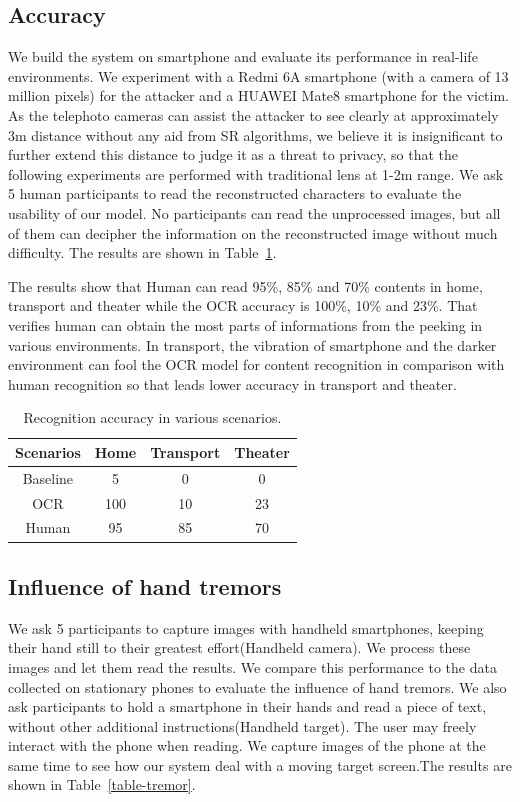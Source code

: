 \subsection{Accuracy}
We build the system on smartphone and evaluate its performance in real-life environments. We experiment with a Redmi 6A smartphone (with a camera of 13 million pixels) for the attacker and a HUAWEI Mate8 smartphone for the victim. As the telephoto cameras can assist the attacker to see clearly at approximately 3m distance without any aid from SR algorithms, we believe it is insignificant to further extend this distance to judge it as a threat to privacy, so that the following experiments are performed with traditional lens at 1-2m range. We ask 5 human participants to read the reconstructed characters to evaluate the usability of our model. No participants can read the unprocessed images, but all of them can decipher the information on the reconstructed image without much difficulty. The results are shown in Table~\ref{table-scenarios}.

The results show that Human can read 95\%, 85\% and 70\% contents in home, transport and theater while the OCR accuracy is 100\%, 10\% and 23\%. That verifies human can obtain the most parts of informations from the peeking in various environments. In transport, the vibration of smartphone and the darker environment can fool the OCR model for content recognition in comparison with human recognition so that leads lower accuracy in transport and theater.

\begin{table}[!t]
    \centering
    \caption{Recognition accuracy in various scenarios.}
    \begin{tabular}{@{}cccc@{}}
        \toprule
    Scenarios & Home & Transport & Theater \\ \midrule
    Baseline & 5 & 0 & 0\\ 
    \midrule
    OCR & 100 & 10 & 23\\ 
    Human & 95 & 85 & 70\\ \bottomrule
    \end{tabular}
    \label{table-scenarios}
\end{table}

\subsection{Influence of hand tremors}
We ask 5 participants to capture images with handheld smartphones, keeping their hand still to their greatest effort(Handheld camera). We process these images and let them read the results. We compare this performance to the data collected on stationary phones to evaluate the influence of hand tremors.
We also ask participants to hold a smartphone in their hands and read a piece of text, without other additional instructions(Handheld target). The user may freely interact with the phone when reading. We capture images of the phone at the same time to see how our system deal with a moving target screen.The results are shown in Table~\ref{table-tremor}.

